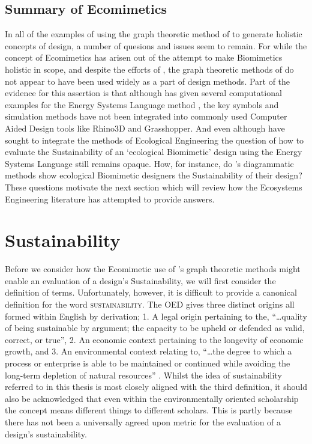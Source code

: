 \subsection{Summary of Ecomimetics}

In all of the examples of using the graph theoretic method of \citeauthor{odum_ecological_1994} to generate holistic concepts of design, a number of quesions and issues seem to remain. For while the concept of Ecomimetics has arisen out of the attempt to make Biomimetics holistic in scope, and despite the efforts of \citeauthor{srinivasan_hierarchy_2015}, the graph theoretic methods of \citeauthor{odum_ecological_1994} do not appear to have been used widely as a part of design methods. Part of the evidence for this assertion is that although \citeauthor{odum_simulation_1989} has given several computational examples for the Energy Systems Language method \citep{odum_energy_1972, odum_simulation_1989, odum_ecological_1994}, the key symbols and simulation methods have not been integrated into commonly used Computer Aided Design tools like Rhino3D and Grasshopper. And even although \citeauthor{holguera_ecomimetics_2014} have sought to integrate the methods of Ecological Engineering the question of how to evaluate the Sustainability of an `ecological Biomimetic' design using the Energy Systems Language still remains opaque. How, for instance, do \citeauthor{odum_ecological_1994}'s diagrammatic methods show ecological Biomimetic designers the Sustainability of their design? These questions motivate the next section which will review how the Ecosystems Engineering literature has attempted to provide answers.

\section{Sustainability}

Before we consider how the Ecomimetic use of \citeauthor{odum_ecological_1994}'s graph theoretic methods might enable an evaluation of a design's Sustainability, we will first consider the definition of terms. Unfortunately, however, it is difficult to provide a canonical definition for the word \textsc{sustainability}. The OED gives three distinct origins all formed within English by derivation; 1. A legal origin pertaining to the, ``\dots quality of being sustainable by argument; the capacity to be upheld or defended as valid, correct, or true'', 2. An economic context pertaining to the longevity of economic growth, and 3. An environmental context relating to, ``\dots the degree to which a process or enterprise is able to be maintained or continued while avoiding the long-term depletion of natural resources'' \cite{oed_sustainability_2022}. Whilst the idea of sustainability referred to in this thesis is most closely aligned with the third definition, it should also be acknowledged that even within the environmentally oriented scholarship the concept means different things to different scholars. This is partly because there has not been a universally agreed upon metric for the evaluation of a design's sustainability.


